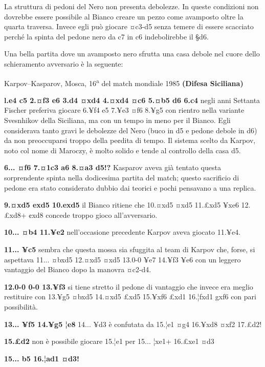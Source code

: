 
La struttura di pedoni del Nero non presenta debolezze. In queste
condizioni non dovrebbe essere possibile al Bianco creare un pezzo come
avamposto oltre la quarta traversa. Invece egli può giocare ¤c3-d5 senza
temere di essere scacciato perché la spinta del pedone nero da c7 in c6
indebolirebbe il §d6.

Una bella partita dove un avamposto nero sfrutta una casa debole nel
cuore dello schieramento avversario è la seguente:

Karpov--Kasparov, Mosca, 16\textsuperscript{a} del match mondiale 1985
\textbf{(Difesa Siciliana)}

\textbf{l.e4 c5 2.¤f3 e6 3.d4 ¤xd4 4.¤xd4 ¤c6 5.¤b5 d6 6.c4} negli anni
Settanta Fischer preferiva giocare 6.¥f4 e5 7.¥e3 ¤f6 8.¥g5 con rientro
nella variante Svesnhikov della Siciliana, ma con un tempo in meno per
il Bianco. Egli considerava tanto gravi le debolezze del Nero (buco in
d5 e pedone debole in d6) da non preoccuparsi troppo della pe¢dita di
tempo. Il sistema scelto da Karpov, noto col nome di Maroczy, è molto
solido e tende al controllo della casa d5.

\textbf{6... ¤f6 7.¤1c3 a6 8.¤a3 d5!?} Kasparov aveva già tentato questa
sorprendente spinta nella dodicesima partita del match; questo
sacrificio di pedone era stato considerato dubbio dai teorici e pochi
pensavano a una replica.

\textbf{9.¤xd5 exd5 10.exd5} il Bianco ritiene che 10.¤xd5 ¤xd5 11.£xd5
¥xe6 12.£xd8+ ¢xd8 concede troppo gioco all'avversario.

\textbf{10... ¤b4 11.¥e2} nell'occasione precedente Karpov aveva giocato
11.¥e4.

\textbf{11... ¥c5} sembra che questa mossa sia sfuggita al team di
Karpov che, forse, si aspettava 11... ¤bxd5 12.¤xd5 ¤xd5 13.0-0 ¥e7
14.¥f3 ¥e6 con un leggero vantaggio del Bianco dopo la manovra ¤c2-d4.

\textbf{12.0-0 0-0 13.¥f3} si tiene stretto il pedone di vantaggio che
invece era meglio restituire con 13.¥g5 ¤bxd5 14.¤xd5 £xd5 15.¥xf6 £xd1
16.¦fxd1 gxf6 con pari possibilità.

\textbf{13... ¥f5 14.¥g5 ¦e8} 14... ¥d3 è confutata da 15.¦e1 ¤g4
16.¥xd8 ¤xf2 17.£d2!

\textbf{15.£d2} non è possibile giocare 15.¦e1 per 15... ¦xe1+ 16.£xe1
¤d3

\textbf{15... b5 16.¦ad1 ¤d3!}

